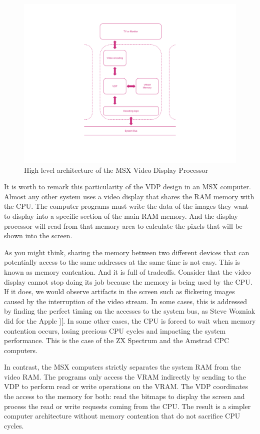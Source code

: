 \begin{figure}
	\centering
	\includegraphics[width=1\linewidth,trim={0cm 100 0 100}]{images/figures/msx-arch-vdp}
	\caption{High level architecture of the MSX Video Display Processor}
	\label{fig:msx-arch-vdp}
\end{figure}

It is worth to remark this particularity of the VDP design in an MSX computer. Almost any other system uses a video display that shares the RAM memory with the CPU. The computer programs must write the data of the images they want to display into a specific section of the main RAM memory. And the display processor will read from that memory area to calculate the pixels that will be shown into the screen. 

As you might think, sharing the memory between two different devices that can potentially access to the same addresses at the same time is not easy. This is known as memory contention. And it is full of tradeoffs. Consider that the video display cannot stop doing its job because the memory is being used by the CPU. If it does, we would observe artifacts in the screen such as flickering images caused by the interruption of the video stream. In some cases, this is addressed by finding the perfect timing on the accesses to the system bus, as Steve Wozniak did for the Apple ][. In some other cases, the CPU is forced to wait when memory contention occurs, losing precious CPU cycles and impacting the system performance. This is the case of the ZX Spectrum and the Amstrad CPC computers. 

In contrast, the MSX computers strictly separates the system RAM from the video RAM. The programs only access the VRAM indirectly by sending  to the VDP to perform read or write operations on the VRAM. The VDP coordinates the access to the memory for both: read the bitmaps to display the screen and process the read or write requests coming from the CPU. The result is a simpler computer architecture without memory contention that do not sacrifice CPU cycles. 

